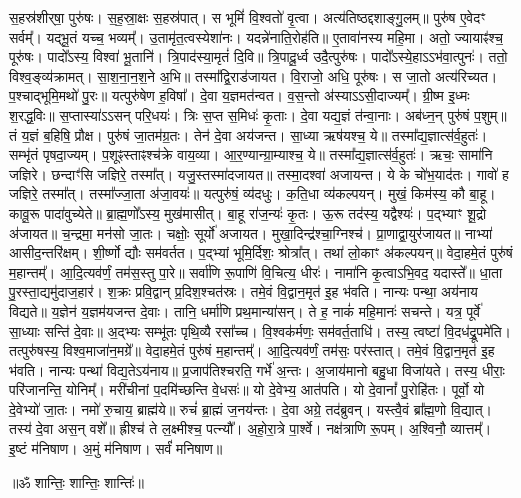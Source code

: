 

स॒हस्र॑शीर्‌षा॒ पुरु॑षः। 
स॒ह॒स्रा॒क्षः स॒हस्र॑पात्। 
स भूमिं॑ वि॒श्वतो॑ वृ॒त्वा। 
अत्य॑तिष्ठद्दशाङ्गु॒लम्॥ 
% 
पुरु॑ष ए॒वेदꣳ सर्वम्᳚। 
यद्भू॒तं यच्च॒ भव्यम्᳚। 
उ॒तामृ॑त॒त्वस्येशा॑नः। 
यदन्ने॑नाति॒रोह॑ति॥ 
% 
ए॒तावा॑नस्य महि॒मा। 
अतो॒ ज्यायाꣴ॑श्च॒ पूरु॑षः। 
पादो᳚ऽस्य॒ विश्वा॑ भू॒तानि॑। 
त्रि॒पाद॑स्या॒मृतं॑ दि॒वि॥ 
% 
त्रि॒पादू॒र्ध्व उदै॒त्पुरु॑षः। 
पादो᳚ऽस्ये॒हाऽऽभ॑वा॒त्पुनः॑। 
ततो॒ विश्व॒ङ्व्य॑क्रामत्। 
सा॒श॒ना॒न॒श॒ने अ॒भि॥ 
% 
तस्मा᳚द्वि॒राड॑जायत। 
वि॒राजो॒ अधि॒ पूरु॑षः। 
स जा॒तो अत्य॑रिच्यत। 
प॒श्चाद्भूमि॒मथो॑ पु॒रः॥ 
% 
 यत्पुरु॑षेण ह॒विषा᳚। 
दे॒वा य॒ज्ञमत॑न्वत। 
व॒स॒न्तो अ॑स्याऽऽसी॒दाज्यम्᳚। 
ग्री॒ष्म इ॒ध्मः श॒रद्ध॒विः॥ 
% 
 स॒प्तास्या॑ऽऽसन्  परि॒धयः॑। 
त्रिः स॒प्त स॒मिधः॑ कृ॒ताः। 
दे॒वा यद्य॒ज्ञं त॑न्वा॒नाः। 
अब॑ध्न॒न् पुरु॑षं प॒शुम्॥ 
% 
 तं य॒ज्ञं ब॒\ar हिषि॒ प्रौक्ष\sn। 
पुरु॑षं जा॒तम॑ग्र॒तः। 
तेन॑ दे॒वा अय॑जन्त। 
सा॒ध्या ऋष॑यश्च॒ ये॥ 
% 
तस्मा᳚द्य॒ज्ञात्स॑र्व॒हुतः॑। 
सम्भृ॑तं पृषदा॒ज्यम्। 
प॒शूꣴस्ताꣴश्च॑क्रे वाय॒व्या\sn{}। 
आ॒र॒ण्यान्ग्रा॒म्याश्च॒ ये॥ 
% 
 तस्मा᳚द्य॒ज्ञात्स॑र्व॒हुतः॑। 
ऋचः॒ सामा॑नि जज्ञिरे। 
छन्दाꣳ॑सि जज्ञिरे॒ तस्मा᳚त्। 
यजु॒स्तस्मा॑दजायत॥ 
% 
तस्मा॒दश्वा॑ अजायन्त। 
ये के चो॑भ॒याद॑तः। 
गावो॑ ह जज्ञिरे॒ तस्मा᳚त्। 
तस्मा᳚ज्जा॒ता अ॑जा॒वयः॑॥ 
% 
यत्पुरु॑षं॒ व्य॑दधुः। 
क॒ति॒धा व्य॑कल्पयन्। 
मुखं॒ किम॑स्य॒ कौ बा॒हू। 
कावू॒रू पादा॑वुच्येते॥ 
% 
ब्रा॒ह्म॒णो᳚ऽस्य॒ मुख॑मासीत्। 
बा॒हू रा॑ज॒न्यः॑ कृ॒तः। 
ऊ॒रू तद॑स्य॒ यद्वैश्यः॑। 
प॒द्भ्याꣳ शू॒द्रो अ॑जायत॥ 
% 
च॒न्द्रमा॒ मन॑सो जा॒तः। 
चक्षोः॒ सूर्यो॑ अजायत। 
मुखा॒दिन्द्र॑श्चा॒ग्निश्च॑। 
प्रा॒णाद्वा॒युर॑जायत॥ 
% 
नाभ्या॑ आसीद॒न्तरि॑क्षम्। 
शी॒र्ष्णो द्यौः सम॑वर्तत। 
प॒द्भ्यां भूमि॒र्दिशः॒ श्रोत्रा᳚त्। 
तथा॑ लो॒काꣳ अ॑कल्पयन्॥ 
% 
वेदा॒हमे॒तं पुरु॑षं म॒हान्तम्᳚। 
आ॒दि॒त्यव॑र्णं॒ तम॑स॒स्तु पा॒रे॥ 
% 
सर्वा॑णि रू॒पाणि॑ वि॒चित्य॒ धीरः॑। 
नामा॑नि कृ॒त्वाऽभि॒वद॒\an{} यदास्ते᳚॥ 
% 
धा॒ता पु॒रस्ता॒द्यमु॑दाज॒हार॑। 
श॒क्रः प्रवि॒द्वान्  प्र॒दिश॒श्चत॑स्रः। 
तमे॒वं वि॒द्वान॒मृत॑ इ॒ह भ॑वति। 
नान्यः पन्था॒ अय॑नाय विद्यते॥ 
% 
य॒ज्ञेन॑ य॒ज्ञम॑यजन्त दे॒वाः। 
तानि॒ धर्मा॑णि प्रथ॒मान्या॑सन्। 
ते ह॒ नाकं॑ महि॒मानः॑ सचन्ते। 
यत्र॒ पूर्वे॑ सा॒ध्याः सन्ति॑ दे॒वाः॥ 
% 
अ॒द्भ्यः सम्भू॑तः पृथि॒व्यै रसा᳚च्च। 
वि॒श्वक॑र्मणः॒ सम॑वर्त॒ताधि॑। 
तस्य॒ त्वष्टा॑ वि॒दध॑द्रू॒पमे॑ति। 
तत्पुरु॑षस्य॒ विश्व॒माजा॑न॒मग्रे᳚॥ 
% 
वेदा॒हमे॒तं पुरु॑षं म॒हान्तम्᳚। 
आ॒दि॒त्यव॑र्णं॒ तम॑सः॒ पर॑स्तात्। 
तमे॒वं वि॒द्वान॒मृत॑ इ॒ह भ॑वति। 
नान्यः पन्था॑ विद्य॒तेऽय॑नाय॥ 
% 
प्र॒जाप॑तिश्चरति॒ गर्भे॑ अ॒न्तः। 
अ॒जाय॑मानो बहु॒धा विजा॑यते। 
तस्य॒ धीराः॒ परि॑जानन्ति॒ योनिम्᳚। 
मरी॑चीनां प॒दमि॑च्छन्ति वे॒धसः॑॥ 
% 
यो दे॒वेभ्य॒ आत॑पति। 
यो दे॒वानां᳚ पु॒रोहि॑तः। 
पूर्वो॒ यो दे॒वेभ्यो॑ जा॒तः। 
नमो॑ रु॒चाय॒ ब्राह्म॑ये॥ 
% 
रुचं॑ ब्रा॒ह्मं ज॒नय॑न्तः। 
दे॒वा अग्रे॒ तद॑ब्रुवन्। 
यस्त्वै॒वं ब्रा᳚ह्म॒णो वि॒द्यात्। 
तस्य॑ दे॒वा अस॒न् वशे᳚॥ 
% 
ह्रीश्च॑ ते ल॒क्ष्मीश्च॒ पत्न्यौ᳚। 
अ॒हो॒रा॒त्रे पा॒र्श्वे। 
नक्ष॑त्राणि रू॒पम्। 
अ॒श्विनौ॒ व्यात्तम्᳚। 
इ॒ष्टं म॑निषाण। 
अ॒मुं म॑निषाण। 
सर्वं॑ मनिषाण॥ 
% 


\centerline{॥ॐ शान्तिः॒ शान्तिः॒ शान्तिः॑॥}